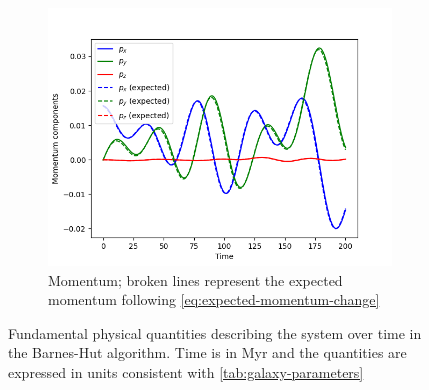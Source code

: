 \begin{figure}[htp]
    \vspace{0.2cm}

    \begin{subfigure}[b]{0.45\textwidth}
        \centering
        \includegraphics[width=\textwidth]{chapters/results/img/bh-galaxy/momentum.png}
        \caption{Momentum; broken lines represent the expected momentum following \autoref{eq:expected-momentum-change}}
        \label{fig:physical-quantities-bh-sub3}
    \end{subfigure}

    \caption{Fundamental physical quantities describing the system over time in the Barnes-Hut algorithm.
        Time is in Myr and the quantities are expressed in units consistent with \autoref{tab:galaxy-parameters}}
    \label{fig:physical-quantities-bh}
\end{figure}